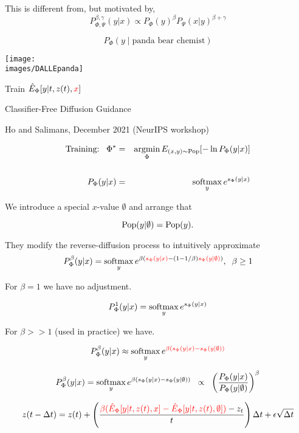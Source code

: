 {\vfill
This is different from, but motivated by,
$$P^{\beta,\gamma}_{\Phi,\Psi}(y|x) \propto P_\Phi(y)^\beta P_\Psi(x|y)^{\beta + \gamma}$$


$$P_\Phi(y\;|\;\mbox{panda bear chemist})$$

\vfill
\centerline{\texttt{[image: \\images/DALLEpanda]}}

\vfill
\centerline {Train $\hat{E}_\Phi[y|t,z(t),{\color{red} x}]$}


\centerline{Classifier-Free Diffusion Guidance}
\centerline{Ho and Salimans, December 2021 (NeurIPS workshop)}
\begin{eqnarray*}
\mbox{Training:}\;\;\;\Phi^* & = & \operatorname*{argmin}_\Phi E_{(x,y) \sim \mathrm{Pop}}[-\ln P_\Phi(y|x)] \\
\\
P_\Phi(y|x) & = & \operatorname*{softmax}_y e^{s_\Phi(y|x)}
\end{eqnarray*}

\vfill
We introduce a special $x$-value $\emptyset$ and arrange that

\vfill
{\color{red} $$\mathrm{Pop}(y|\emptyset) = \mathrm{Pop}(y).$$}


They modify the reverse-diffusion process to intuitively approximate
$$P^\beta_\Phi(y|x) = \operatorname*{softmax}_y e^{\beta({\color{red} s_\Phi(y|x)} - (1-1/\beta){\color{red} s_\Phi(y|\emptyset)})},\;\;\beta \geq 1$$

\vfill
For $\beta = 1$ we have no adjustment.

$$P^1_\Phi(y|x) = \operatorname*{softmax}_y e^{s_\Phi(y|x)}$$

\vfill
For $\beta >> 1$ (used in practice) we have.

$$P^\beta_\Phi(y|x) \approx \operatorname*{softmax}_y e^{\color{red} \beta(s_\Phi(y|x) - s_\Phi(y|\emptyset))}$$



$$P^\beta_\Phi(y|x) = \operatorname*{softmax}_y e^{\beta(s_\Phi(y|x) - s_\Phi(y|\emptyset))}\;\;\propto \;\;      \left(\frac{P_\Phi(y|x)}{P_\Phi(y|\emptyset)}\right)^\beta$$

\vfill

\vfill
{\huge $$z(t - \Delta t) = z(t) + \left(\frac{{\color{red} \beta(\hat{E}_\Phi[y|t,z(t),x] - \hat{E}_\Phi[y|t,z(t),\emptyset])} - z_t}{t}\right)\Delta t + \epsilon\sqrt{\Delta t}$$}


}
